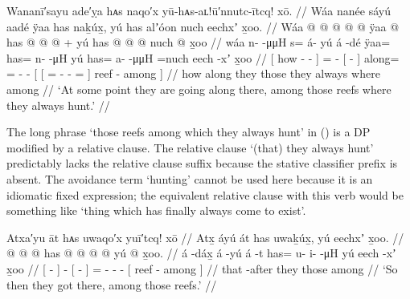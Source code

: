 \ex\label{ex:106-4-rocks-among}%
%
\begingl
	\glpreamble	Wananī′sayu ade′ỵa hᴀs naqo′x yū-hᴀs-aʟ!ū′nnutc-ītcq! xō. //
	\glpreamble	Wáa nanée sáyú aadé ÿaa has naḵúx̱, yú has alʼóon nuch eechxʼ x̱oo. //
	\gla	{} Wáa  @ {} @ {} {}  @ {} @ {}
			{}  @ {} {} ÿaa @ has @  @ {} @ {} +
			{} yú {} has @  @ {} @ {} \•nuch {} {}
				 @ {} x̱oo {} //
	\glb	{} wáa n-  -μμH {} s= á- yú
			{} á -dé {} ÿaa= has= n-  -μH
			{} yú {} has= a-  -μμH =nuch {} {}
				eech -xʼ x̱oo {} //
	\glc	{}[ how -  - {}] =  -
			{}[  - {}] along= = -  -
			{}[  {}[ = -  - = \· {}]
				 reef - among {}] //
	\gld	{} how  {} {} {} {}  {}
			{}  {} {} along they  {} {}
			{} those {} they  {} {} \•always \·where {}  {} among {} //
	\glft	‘At some point they are going along there, among those reefs where they always hunt.’
		//
\endgl
\xe

The long phrase  ‘those reefs among which they always hunt’ in (\lastx) is a DP modified by a relative clause.
The relative clause  ‘(that) they always hunt’ predictably lacks the relative clause suffix  because the stative  classifier prefix is absent.
The avoidance term  ‘hunting’ cannot be used here because it is an idiomatic fixed expression; the equivalent relative clause with this verb would be something like  ‘thing which has finally always come to exist’.

\ex\label{ex:106-5-got-there-among-reefs}%
%
\begingl
	\glpreamble	Atxa′yu āt hᴀs uwaqo′x yuī′tcq! xō //
	\glpreamble	Atx̱ áyú át has uwaḵúx̱, yú eechxʼ x̱oo. //
	\gla	{}  @ {} {}  @ {}
			{}  @ {} {} has @  @ {} @ {} @ {} 
			{} yú  @ {} x̱oo. {} //
	\glb	{} á -dáx̱ {} á -yú
			{} á -t {} has= u- i-  -μH
			{} yú eech -xʼ x̱oo {} //
	\glc	{}[  - {}]  -
			{}[  - {}] = - -  -
			{}[  reef - among {}] //
	\gld	{} that -after {}  {}
			{}  {} {} they  {} {} {}
			{} those  {} among {} //
	\glft	‘So then they got there, among those reefs.’
		//
\endgl
\xe

